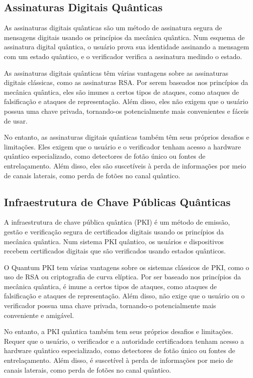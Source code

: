 \subsection{Assinaturas Digitais Quânticas}

As assinaturas digitais quânticas são um método de assinatura segura de mensagens digitais usando os princípios da mecânica quântica. Num esquema de assinatura digital quântica, o usuário prova sua identidade assinando a mensagem com um estado quântico, e o verificador verifica a assinatura medindo o estado.

As assinaturas digitais quânticas têm várias vantagens sobre as assinaturas digitais clássicas, como as assinaturas RSA. Por serem baseados nos princípios da mecânica quântica, eles são imunes a certos tipos de ataques, como ataques de falsificação e ataques de representação. Além disso, eles não exigem que o usuário possua uma chave privada, tornando-os potencialmente mais convenientes e fáceis de usar.

No entanto, as assinaturas digitais quânticas também têm seus próprios desafios e limitações. Eles exigem que o usuário e o verificador tenham acesso a hardware quântico especializado, como detectores de fotão único ou fontes de entrelaçamento. Além disso, eles são suscetíveis à perda de informações por meio de canais laterais, como perda de fotões no canal quântico.

\subsection{Infraestrutura de Chave Públicas Quânticas}

A infraestrutura de chave pública quântica (PKI) é um método de emissão, gestão e verificação segura de certificados digitais usando os princípios da mecânica quântica. Num sistema PKI quântico, os usuários e dispositivos recebem certificados digitais que são verificados usando estados quânticos.

O Quantum PKI tem várias vantagens sobre os sistemas clássicos de PKI, como o uso de RSA ou criptografia de curva elíptica. Por ser baseado nos princípios da mecânica quântica, é imune a certos tipos de ataques, como ataques de falsificação e ataques de representação. Além disso, não exige que o usuário ou o verificador possua uma chave privada, tornando-o potencialmente mais conveniente e amigável.

No entanto, a PKI quântica também tem seus próprios desafios e limitações. Requer que o usuário, o verificador e a autoridade certificadora tenham acesso a hardware quântico especializado, como detectores de fotão único ou fontes de entrelaçamento. Além disso, é suscetível à perda de informações por meio de canais laterais, como perda de fotões no canal quântico.

\newpage
